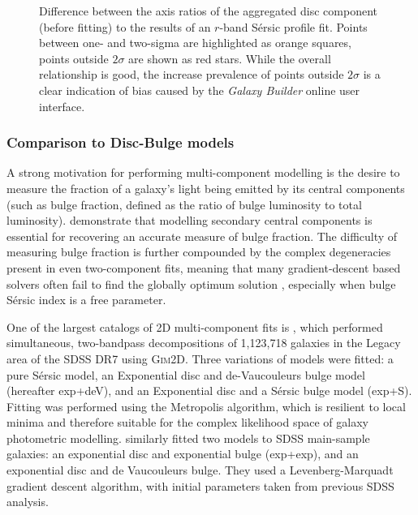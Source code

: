 \documentclass[../main.tex]{subfiles}
\begin{document}
\begin{figure}
  \caption{Difference between the axis ratios of the aggregated disc component (before fitting) to the results of an $r$-band S\'ersic profile fit. Points  between one- and two-sigma are highlighted as orange squares, points outside $2\sigma$ are shown as red stars. While the overall relationship is good, the increase prevalence of points outside $2\sigma$ is a clear indication of bias caused by the \textit{Galaxy Builder} online user interface.}
  \label{fig:ax_ratio_comparison}
\end{figure}


\subsubsection{Comparison to Disc-Bulge models}

A strong motivation for performing multi-component modelling is the desire to measure the fraction of a galaxy's light being emitted by its central components (such as bulge fraction, defined as the ratio of bulge luminosity to total luminosity). \citet{Gao2017:1709.00746v1} demonstrate that modelling secondary central components is essential for recovering an accurate measure of bulge fraction. The difficulty of measuring bulge fraction is further compounded by the complex degeneracies present in even two-component fits, meaning that many gradient-descent based solvers often fail to find the globally optimum solution \citep{profit-paper}, especially when bulge S\'ersic index is a free parameter.

One of the largest catalogs of 2D multi-component fits is \citet{2011ApJS..196...11S}, which performed simultaneous, two-bandpass decompositions of 1,123,718 galaxies in the Legacy area of the SDSS DR7 using \textsc{Gim2D}. Three variations of models were fitted: a pure S\'ersic model, an Exponential disc and de-Vaucouleurs bulge model (hereafter exp+deV), and an Exponential disc and a S\'ersic bulge model (exp+S). Fitting was performed using the Metropolis algorithm, which is resilient to local minima and therefore suitable for the complex likelihood space of galaxy photometric modelling. \citet{2012MNRAS.421.2277L} similarly fitted two models to SDSS main-sample galaxies: an exponential disc and exponential bulge (exp+exp), and an exponential disc and de Vaucouleurs bulge. They used a Levenberg-Marquadt gradient descent algorithm, with initial parameters taken from previous SDSS analysis.
\end{document}
